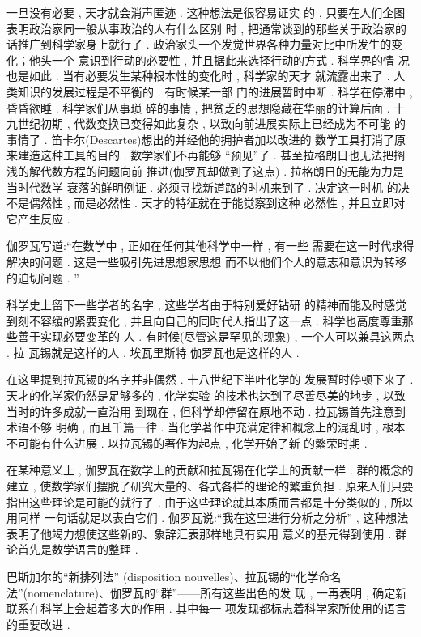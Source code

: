 一旦没有必要 , 天才就会消声匿迹 . 这种想法是很容易证实 的 , 只要在人们企图表明政治家同一般从事政治的人有什么区别 时 , 把通常谈到的那些关于政治家的话推广到科学家身上就行了 .  政治家头一个发觉世界各种力量对比中所发生的变化；他头一个 意识到行动的必要性 , 并且据此来选择行动的方式 . 科学界的情 况也是如此 . 当有必要发生某种根本性的变化时 , 科学家的天才 就流露出来了 . 人类知识的发展过程是不平衡的 . 有时候某一部 门的进展暂时中断 . 科学在停滞中 , 昏昏欲睡 . 科学家们从事琐 碎的事情 , 把贫乏的思想隐藏在华丽的计算后面 . 十九世纪初期 ,  代数变换已变得如此复杂 , 以致向前进展实际上已经成为不可能 的事情了 . 笛卡尔(Descartes)想出的并经他的拥护者加以改进的 数学工具打消了原来建造这种工具的目的 . 数学家们不再能够 “预见”了 . 甚至拉格朗日也无法把搁浅的解代数方程的问题向前 推进(伽罗瓦却做到了这点) . 拉格朗日的无能为力是当时代数学 衰落的鲜明例证 . 必须寻找新道路的时机来到了 . 决定这一时机 的决不是偶然性 , 而是必然性 . 天才的特征就在于能觉察到这种 必然性 , 并且立即对它产生反应 . 

伽罗瓦写道:“在数学中 , 正如在任何其他科学中一样 , 有一些 需要在这一时代求得解决的问题 . 这是一些吸引先进思想家思想 而不以他们个人的意志和意识为转移的迫切问题 . ”

科学史上留下一些学者的名字 , 这些学者由于特别爱好钻研 的精神而能及时感觉到刻不容缓的紧要变化 , 并且向自己的同时代人指出了这一点 . 科学也高度尊重那些善于实现必要变革的 人 . 有时候(尽管这是罕见的现象) , 一个人可以兼具这两点 . 拉 瓦锡就是这样的人 , 埃瓦里斯特 \textbullet 伽罗瓦也是这样的人 . 

在这里提到拉瓦锡的名字并非偶然 . 十八世纪下半叶化学的 发展暂时停顿下来了 . 天才的化学家仍然是足够多的 , 化学实验 的技术也达到了尽善尽美的地步 , 以致当时的许多成就一直沿用 到现在 , 但科学却停留在原地不动 . 拉瓦锡首先注意到术语不够 明确 , 而且千篇一律 . 当化学著作中充满定律和概念上的混乱时 ,  根本不可能有什么进展 . 以拉瓦锡的著作为起点 , 化学开始了新 的繁荣时期 . 

在某种意义上 , 伽罗瓦在数学上的贡献和拉瓦锡在化学上的贡献一样 . 群的概念的建立 , 使数学家们摆脱了研究大量的、各式各样的理论的繁重负担 . 原来人们只要指出这些理论是可能的就行了 . 由于这些理论就其本质而言都是十分类似的 , 所以用同样 一句话就足以表白它们 . 伽罗瓦说:“我在这里进行分析之分析” ,  这种想法表明了他竭力想使这些新的、象辞汇表那样地具有实用 意义的基元得到使用 . 群论首先是数学语言的整理 . 

巴斯加尔的“新排列法” (disposition nouvelles)、拉瓦锡的“化学命名法”(nomenclature)、伽罗瓦的“群”——所有这些出色的发 现 , 一再表明 , 确定新联系在科学上会起着多大的作用 . 其中每一 项发现都标志着科学家所使用的语言的重要改进 . 

